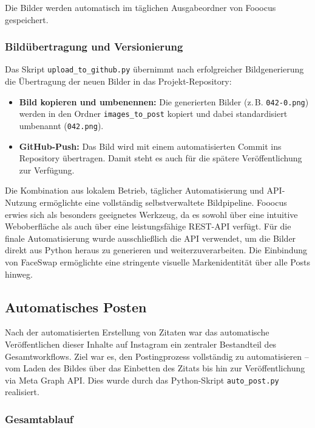\documentclass[a4paper,12pt]{article}
\begin{document}
Die Bilder werden automatisch im täglichen Ausgabeordner von Fooocus gespeichert.

\subsubsection*{Bildübertragung und Versionierung}

Das Skript \texttt{upload\_to\_github.py} übernimmt nach erfolgreicher Bildgenerierung die Übertragung der neuen Bilder in das Projekt-Repository:

\begin{itemize}
    \item \textbf{Bild kopieren und umbenennen:} Die generierten Bilder (z.\,B. \texttt{042-0.png}) werden in den Ordner \texttt{images\_to\_post} kopiert und dabei standardisiert umbenannt (\texttt{042.png}).
    
    \item \textbf{GitHub-Push:} Das Bild wird mit einem automatisierten Commit ins Repository übertragen. Damit steht es auch für die spätere Veröffentlichung zur Verfügung.
\end{itemize}

Die Kombination aus lokalem Betrieb, täglicher Automatisierung und API-Nutzung ermöglichte eine vollständig selbstverwaltete Bildpipeline. Fooocus erwies sich als besonders geeignetes Werkzeug, da es sowohl über eine intuitive Weboberfläche als auch über eine leistungsfähige REST-API verfügt. Für die finale Automatisierung wurde ausschließlich die API verwendet, um die Bilder direkt aus Python heraus zu generieren und weiterzuverarbeiten. Die Einbindung von FaceSwap ermöglichte eine stringente visuelle Markenidentität über alle Posts hinweg.


\subsection{Automatisches Posten}

Nach der automatisierten Erstellung von Zitaten war das automatische Veröffentlichen dieser Inhalte auf Instagram ein zentraler Bestandteil des Gesamtworkflows. Ziel war es, den Postingprozess vollständig zu automatisieren – vom Laden des Bildes über das Einbetten des Zitats bis hin zur Veröffentlichung via Meta Graph API. Dies wurde durch das Python-Skript \texttt{auto\_post.py} realisiert.

\subsubsection*{Gesamtablauf}
\end{document}
